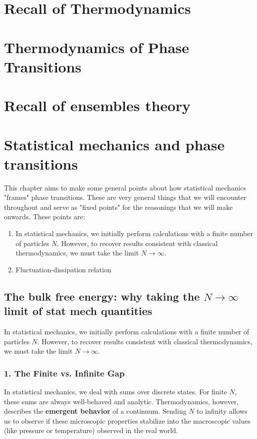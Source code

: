\documentclass{book}
\begin{document}
\tableofcontents
\chapter{Recall of Thermodynamics}
\chapter{Thermodynamics of Phase Transitions}
\chapter{Recall of ensembles theory}
\chapter{Statistical mechanics and phase transitions}
This chapter aims to make some general points about how statistical mechanics "frames" phase transitions.
These are very general things that we will encounter throughout and serve as "fixed points" for the reasonings
that we will make onwards. These points are:

\begin{enumerate}
    \item In statistical mechanics, we initially perform calculations with a finite number of particles $N$. However, to recover results consistent with classical thermodynamics, we must take the limit $N \to \infty$. 
    \item Fluctuation-dissipation relation
\end{enumerate}

\section{The bulk free energy: why taking the $N\rightarrow \infty$ limit of stat mech quantities}

\begin{tcolorbox}[colback=blue!5!white,colframe=blue!75!black,title=Key Concept]
In statistical mechanics, we initially perform calculations with a finite number of particles $N$. However, to recover results consistent with classical thermodynamics, we must take the limit $N \to \infty$. 
\end{tcolorbox}

\subsection*{1. The Finite vs. Infinite Gap}
In statistical mechanics, we deal with sums over discrete states. For finite $N$, these sums are always well-behaved and analytic. Thermodynamics, however, describes the \textbf{emergent behavior} of a continuum. Sending $N$ to infinity allows us to observe if these microscopic properties stabilize into the macroscopic values (like pressure or temperature) observed in the real world.
\end{document}
